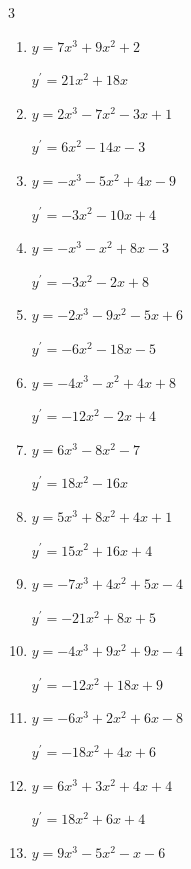 \begin{multicols}{3}
\begin{enumerate}
        $\displaystyle y^{\prime}=-18x^{2}-16x+2$

  \item $y=7x^{3}+9x^{2}+2$

        $\displaystyle y^{\prime}=21x^{2}+18x$

  \item $y=2x^{3}-7x^{2}-3x+1$

        $\displaystyle y^{\prime}=6x^{2}-14x-3$

  \item $y=-x^{3}-5x^{2}+4x-9$

        $\displaystyle y^{\prime}=-3x^{2}-10x+4$

  \item $y=-x^{3}-x^{2}+8x-3$

        $\displaystyle y^{\prime}=-3x^{2}-2x+8$

  \item $y=-2x^{3}-9x^{2}-5x+6$

        $\displaystyle y^{\prime}=-6x^{2}-18x-5$

  \item $y=-4x^{3}-x^{2}+4x+8$

        $\displaystyle y^{\prime}=-12x^{2}-2x+4$

  \item $y=6x^{3}-8x^{2}-7$

        $\displaystyle y^{\prime}=18x^{2}-16x$

  \item $y=5x^{3}+8x^{2}+4x+1$

        $\displaystyle y^{\prime}=15x^{2}+16x+4$

  \item $y=-7x^{3}+4x^{2}+5x-4$

        $\displaystyle y^{\prime}=-21x^{2}+8x+5$

  \item $y=-4x^{3}+9x^{2}+9x-4$

        $\displaystyle y^{\prime}=-12x^{2}+18x+9$

  \item $y=-6x^{3}+2x^{2}+6x-8$

        $\displaystyle y^{\prime}=-18x^{2}+4x+6$

  \item $y=6x^{3}+3x^{2}+4x+4$

        $\displaystyle y^{\prime}=18x^{2}+6x+4$

  \item $y=9x^{3}-5x^{2}-x-6$


\end{enumerate}
\end{multicols}
